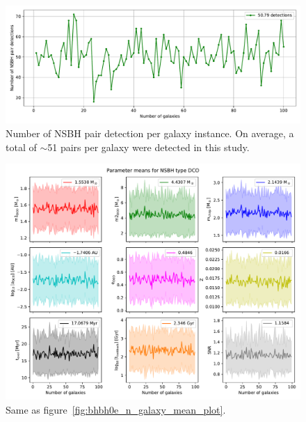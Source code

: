 \begin{figure}[!h]
	\centering
	\includegraphics[width=\columnwidth]{analysis_data/004__images_for_latex/NSBH0e_n_detections}
	\caption{Number of NSBH pair detection per galaxy instance. On average, a total of $\sim$51 pairs per galaxy were detected in this study.}
	\label{fig:nsbh0endetections}
\end{figure}

\begin{figure}[!h]
	\centering
	\includegraphics[width=\columnwidth]{analysis_data/004__images_for_latex/NSBH0e_n_galaxy_mean_plot}
	\caption{Same as figure~\ref{fig:bhbh0e_n_galaxy_mean_plot}.}
	\label{fig:nsbh0e_n_galaxy_mean_plot}
\end{figure}
